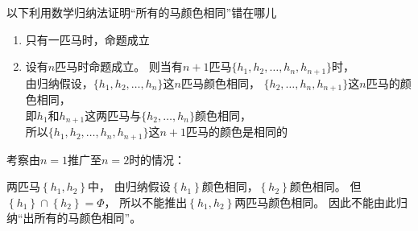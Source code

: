 \documentclass[answers]{exam}
\begin{document}
\begin{questions}
    \question 以下利用数学归纳法证明“所有的马颜色相同”错在哪儿
    \begin{enumerate}
        \item 只有一匹马时，命题成立
        \item {
              设有$n$匹马时命题成立。
              则当有$n+1$匹马$\{h_1,h_2,\dots,h_n,h_{n+1}\}$时， \\
              由归纳假设，$\{h_1,h_2,\dots,h_n\}$这$n$匹马颜色相同，
              $\{h_2,\dots,h_n,h_{n+1}\}$这$n$匹马的颜色相同， \\
              即$h_1$和$h_{n+1}$这两匹马与$\{h_2,\dots,h_n\}$颜色相同， \\
              所以$\{h_1,h_2,\dots,h_n,h_{n+1}\}$这$n+1$匹马的颜色是相同的
              }
    \end{enumerate}

    \begin{solution}
        考察由$n=1$推广至$n=2$时的情况：

        两匹马$\left\{ h_1, h_2 \right\}$中，
        由归纳假设$\left\{h_1\right\}$颜色相同，$\left\{h_2\right\}$颜色相同。
        但$\left\{h_1\right\} \cap \left\{h_2\right\} = \Phi$，
        所以不能推出$\left\{h_1,h_2\right\}$两匹马颜色相同。
        因此不能由此归纳“出所有的马颜色相同”。
    \end{solution}

\end{questions}
\end{document}
